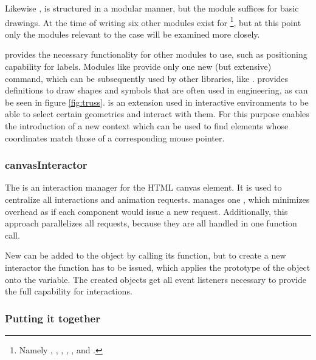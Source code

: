 Likewise ,  is structured in a modular manner, but the  module suffices for basic drawings.
At the time of writing six other modules exist for \footnote{Namely , , , , ,  and .}, but at this point only the modules relevant to the case will be examined more closely.

 provides the necessary functionality for other modules to use, such as positioning capability for labels.
Modules like  provide only one new (but extensive) command, which can be subsequently used by other libraries, like .
 provides definitions to draw shapes and symbols that are often used in engineering, as can be seen in figure \ref{fig:truss}.
 is an extension used in interactive environments to be able to select certain geometries and interact with them.
For this purpose  enables the introduction of a new context which can be used to find elements whose coordinates match those of a corresponding mouse pointer.

\subsubsection{canvasInteractor}

The  %
is an interaction manager for the HTML canvas element.
It is used to centralize all interactions and animation requests.
 manages one , which minimizes overhead as if each component would issue a new request.
Additionally, this approach parallelizes all requests, because they are all handled in one function call.

New  can be added to the  object by calling its  function, but to create a new interactor the  function has to be issued, which applies the prototype of the  object onto the variable.
The created objects get all event listeners necessary to provide the full capability for interactions.

\subsubsection{Putting it together}


